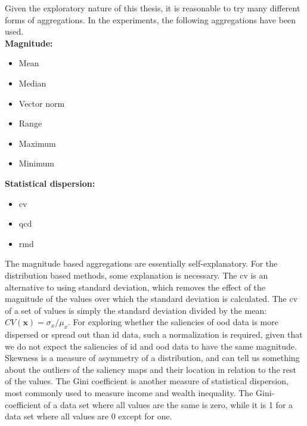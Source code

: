 \documentclass[UKenglish]{uiomasterthesis} %
\theoremstyle{definition}
\begin{document}
Given the exploratory nature of this thesis, it is reasonable to try many different forms of aggregations. In the experiments, the following aggregations have been used. \\

\textbf{Magnitude:}
\begin{itemize}
    \itemsep0em
    \item Mean
    \item Median
    \item Vector norm
    \item Range
    \item Maximum
    \item Minimum
\end{itemize}

\textbf{Statistical dispersion:}
\begin{itemize}
    \itemsep0em
    \item \ac{cv}
    \item \ac{qcd}
    \item \ac{rmd}
\end{itemize}

The magnitude based aggregations are essentially self-explanatory. For the distribution based methods, some explanation is necessary. The \acf{cv} is an alternative to using standard deviation, which removes the effect of the magnitude of the values over which the standard deviation is calculated. The \ac{cv} of a set of values is simply the standard deviation divided by the mean: $CV(\mathbf{x}) = \sigma_x / \mu_x$. For exploring whether the saliencies of \ac{ood} data is more dispersed or spread out than \ac{id} data, such a normalization is required, given that we do not expect the saliencies of \ac{id} and \ac{ood} data to have the same magnitude. Skewness is a measure of asymmetry of a distribution, and can tell us something about the outliers of the saliency maps and their location in relation to the rest of the values. The Gini coefficient is another measure of statistical dispersion, most commonly used to measure income and wealth inequality. The Gini-coefficient of a data set where all values are the same is zero, while it is 1 for a data set where all values are 0 except for one. 

%
%
%
\end{document}
